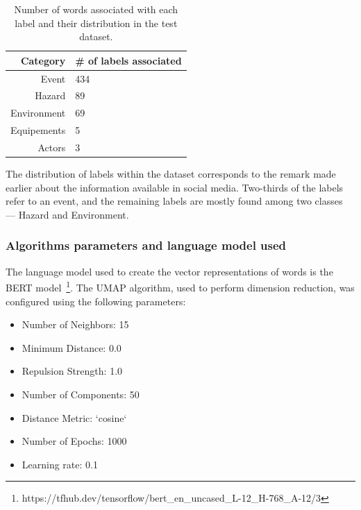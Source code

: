 \begin{table}[bht]
    \centering
    \caption{Number of words associated with each label and their distribution in the test dataset.}
    \begin{tabular}{rl}
        Category    & \# of labels associated \\
        \toprule
        Event       & 434                     \\
        Hazard      & 89                      \\
        Environment & 69                      \\
        Equipements & 5                       \\
        Actors      & 3                       \\
        \bottomrule
    \end{tabular}
    \label{table:labels-distribution}
\end{table}

The distribution of labels within the dataset corresponds to the remark made earlier about
the information available in social media.
Two-thirds of the labels refer to an event, and the remaining labels are mostly found among
two classes — Hazard and Environment.

\subsubsection{Algorithms parameters and language model used}
The language model used to create the vector representations of words is the BERT
model~\footnote{https://tfhub.dev/tensorflow/bert\_en\_uncased\_L-12\_H-768\_A-12/3}.
The UMAP algorithm, used to perform dimension reduction, was configured using the following parameters:

\begin{itemize}
    \item Number of Neighbors: 15
    \item Minimum Distance: 0.0
    \item Repulsion Strength: 1.0
    \item Number of Components: 50
    \item Distance Metric: `cosine`
    \item Number of Epochs: 1000
    \item Learning rate: 0.1
\end{itemize}

